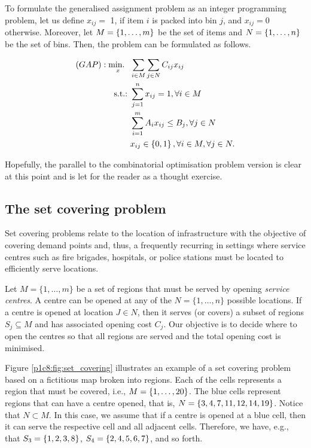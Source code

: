 To formulate the generalised assignment problem as an integer programming problem, let us define $x_{ij} =$ 1, if item $i$ is packed into bin $j$, and $x_{ij} = 0$ otherwise. Moreover, let $M = \left\{ 1,\dots,m \right \}$ be the set of items and $N = \left\{ 1,\dots,n \right \}$ be the set of bins. Then, the problem can be formulated as follows.

\begin{align*}
	(GAP) : \mathop{\text{min.~}}_x \ & \sum_{i \in M}\sum_{j \in N} C_{ij}x_{ij} \\
	\mathop{\text{s.t.:~}} & \sum_{j=1}^n x_{ij} = 1, \forall i \in M\\
	  & \sum_{i=1}^m A_{i}x_{ij} \leq B_j, \forall j \in N\\
	  & x_{ij} \in \left\{ 0,1 \right \}, \forall i \in M, \forall j \in N. 
\end{align*} 

Hopefully, the parallel to the combinatorial optimisation problem version is clear at this point and is let for the reader as a thought exercise. 


\subsection{The set covering problem}

Set covering problems relate to the location of infrastructure with the objective of covering demand points and, thus, a frequently recurring in settings where service centres such as fire brigades, hospitals, or police stations must be located to efficiently serve locations.

Let $M = \{1,\dots,m\}$ be a set of regions that must be served by opening \emph{service centres}. A centre can be opened at any of the $N = \{1,\dots,n\}$ possible locations. If a centre is opened at location $J \in N$, then it serves (or covers) a subset of regions $S_j \subseteq M$ and has associated opening cost $C_j$. Our objective is to decide where to open the centres so that all regions are served and the total opening cost is minimised. 

Figure \ref{p1c8:fig:set_covering} illustrates an example of a set covering problem based on a fictitious map broken into regions. Each of the cells represents a region that must be covered, i.e., $M = \left\{ 1,\dots, 20 \right \}$. The blue cells represent regions that can have a centre opened, that is, $N = \left\{ 3,4,7,11,12,14,19 \right \}$. Notice that $N \subset M$. In this case, we assume that if a centre is opened at a blue cell, then it can serve the respective cell and all adjacent cells. Therefore, we have, e.g., that $S_3 = \left\{ 1,2,3,8 \right \}$, $S_4=\left\{ 2,4,5,6,7 \right \}$, and so forth.

